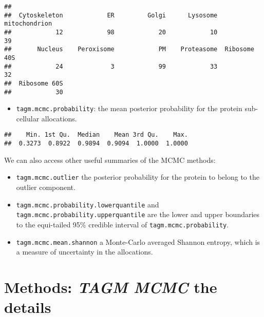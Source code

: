 \documentclass[]{article}
\newenvironment{Shaded}{\begin{snugshade}}{\end{snugshade}}
\newcommand{\KeywordTok}[1]{\textcolor[rgb]{0.13,0.29,0.53}{\textbf{{#1}}}}
\newcommand{\NormalTok}[1]{{#1}}
\providecommand{\tightlist}{%
  \setlength{\itemsep}{0pt}\setlength{\parskip}{0pt}}
\begin{document}
\begin{verbatim}
## 
##  Cytoskeleton            ER         Golgi      Lysosome mitochondrion 
##            12            98            20            10            39 
##       Nucleus    Peroxisome            PM    Proteasome  Ribosome 40S 
##            24             3            99            33            32 
##  Ribosome 60S 
##            30
\end{verbatim}

\begin{itemize}
\tightlist
\item
  \texttt{tagm.mcmc.probability}: the mean posterior probability for the
  protein sub-cellular allocations.
\end{itemize}

\begin{Shaded}
\end{Shaded}

\begin{verbatim}
##    Min. 1st Qu.  Median    Mean 3rd Qu.    Max. 
##  0.3273  0.8922  0.9894  0.9094  1.0000  1.0000
\end{verbatim}

We can also access other useful summaries of the MCMC methods:

\begin{itemize}
\item
  \texttt{tagm.mcmc.outlier} the posterior probability for the protein
  to belong to the outlier component.
\item
  \texttt{tagm.mcmc.probability.lowerquantile} and
  \texttt{tagm.mcmc.probability.upperquantile} are the lower and upper
  boundaries to the equi-tailed 95\% credible interval of
  \texttt{tagm.mcmc.probability}.
\item
  \texttt{tagm.mcmc.mean.shannon} a Monte-Carlo averaged Shannon
  entropy, which is a measure of uncertainty in the allocations.
\end{itemize}

\section{\texorpdfstring{Methods: \emph{TAGM MCMC} the
details}{Methods: TAGM MCMC the details}}\label{methods-tagm-mcmc-the-details}
\end{document}

